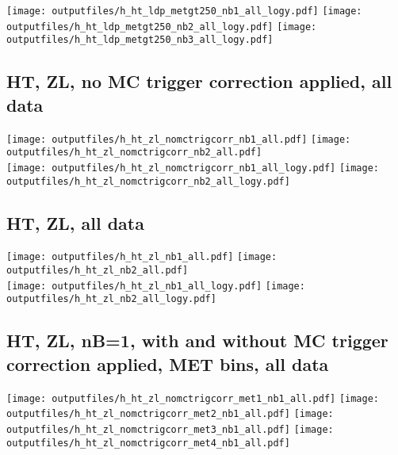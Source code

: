 \documentclass[11pt]{article}
\begin{document}
    \noindent
     \texttt{[image: outputfiles/h\_ht\_ldp\_metgt250\_nb1\_all\_logy.pdf]}
     \texttt{[image: outputfiles/h\_ht\_ldp\_metgt250\_nb2\_all\_logy.pdf]}
     \texttt{[image: outputfiles/h\_ht\_ldp\_metgt250\_nb3\_all\_logy.pdf]}


     \subsection{ HT, ZL, no MC trigger correction applied, all data}

    \noindent
     \texttt{[image: outputfiles/h\_ht\_zl\_nomctrigcorr\_nb1\_all.pdf]}
     \texttt{[image: outputfiles/h\_ht\_zl\_nomctrigcorr\_nb2\_all.pdf]} \\

    \noindent
     \texttt{[image: outputfiles/h\_ht\_zl\_nomctrigcorr\_nb1\_all\_logy.pdf]}
     \texttt{[image: outputfiles/h\_ht\_zl\_nomctrigcorr\_nb2\_all\_logy.pdf]}


     \subsection{ HT, ZL, all data}

    \noindent
     \texttt{[image: outputfiles/h\_ht\_zl\_nb1\_all.pdf]}
     \texttt{[image: outputfiles/h\_ht\_zl\_nb2\_all.pdf]} \\

    \noindent
     \texttt{[image: outputfiles/h\_ht\_zl\_nb1\_all\_logy.pdf]}
     \texttt{[image: outputfiles/h\_ht\_zl\_nb2\_all\_logy.pdf]}


   \clearpage
     \subsection{ HT, ZL, nB=1, with and without MC trigger correction applied, MET bins, all data}

    \noindent
     \texttt{[image: outputfiles/h\_ht\_zl\_nomctrigcorr\_met1\_nb1\_all.pdf]}
     \texttt{[image: outputfiles/h\_ht\_zl\_nomctrigcorr\_met2\_nb1\_all.pdf]}
     \texttt{[image: outputfiles/h\_ht\_zl\_nomctrigcorr\_met3\_nb1\_all.pdf]}
     \texttt{[image: outputfiles/h\_ht\_zl\_nomctrigcorr\_met4\_nb1\_all.pdf]}
\end{document}
